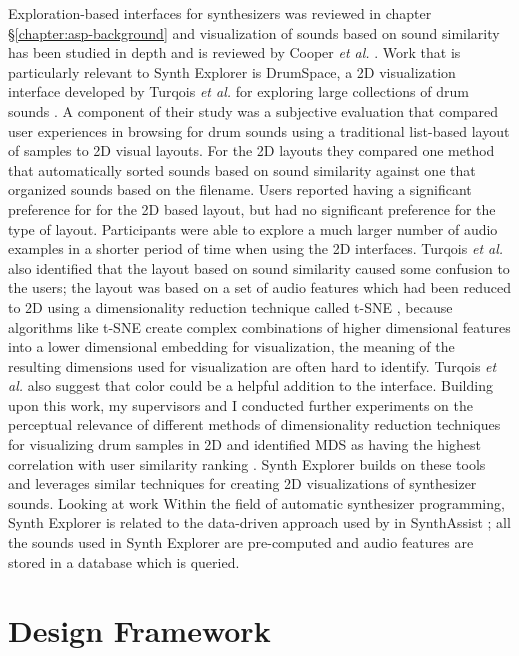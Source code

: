 Exploration-based interfaces for synthesizers was reviewed in chapter \S\ref{chapter:asp-background} and visualization of sounds based on sound similarity has been studied in depth and is reviewed by Cooper \textit{et al.} \cite{cooper2006visualization}. Work that is particularly relevant to Synth Explorer is DrumSpace, a 2D visualization interface developed by Turqois \textit{et al.} for exploring large collections of drum sounds \cite{turquois2016exploring}. A component of their study was a subjective evaluation that compared user experiences in browsing for drum sounds using a traditional list-based layout of samples to 2D visual layouts. For the 2D layouts they compared one method that automatically sorted sounds based on sound similarity against one that organized sounds based on the filename. Users reported having a significant preference for for the 2D based layout, but had no significant preference for the type of layout. Participants were able to explore a much larger number of audio examples in a shorter period of time when using the 2D interfaces. Turqois \textit{et al.} also identified that the layout based on sound similarity caused some confusion to the users; the layout was based on a set of audio features which had been reduced to 2D using a dimensionality reduction technique called t-SNE \cite{van2008visualizing}, because algorithms like t-SNE create complex combinations of higher dimensional features into a lower dimensional embedding for visualization, the meaning of the resulting dimensions used for visualization are often hard to identify. Turqois \textit{ et al.} also suggest that color could be a helpful addition to the interface. Building upon this work, my supervisors and I conducted further experiments on the perceptual relevance of different methods of dimensionality reduction techniques for visualizing drum samples in 2D and identified MDS as having the highest correlation with user similarity ranking \cite{shier2021manifold}. Synth Explorer builds on these tools and leverages similar techniques for creating 2D visualizations of synthesizer sounds. Looking at work Within the field of automatic synthesizer programming, Synth Explorer is related to the data-driven approach used by in SynthAssist \cite{cartwright2014synthassist}; all the sounds used in Synth Explorer are pre-computed and audio features are stored in a database which is queried.

\section{Design Framework}

